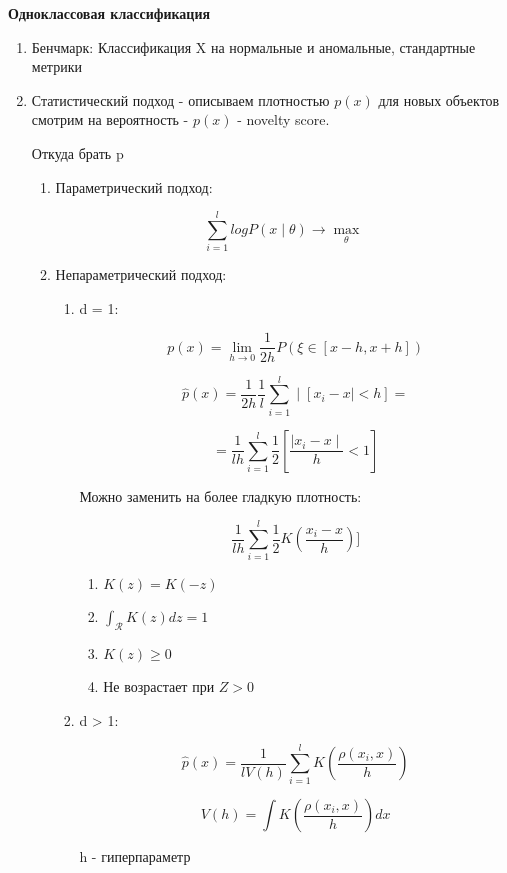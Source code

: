 \documentclass[a4paper, 12pt]{article}
\begin{document}
\textbf{Одноклассовая классификация}
\begin{enumerate}
    \item Бенчмарк: Классификация X на нормальные и аномальные, 
    стандартные метрики
    \item Статистический подход - описываем плотностью $p(x)$ для
    новых объектов смотрим на вероятность - $p(x)$ - novelty score.

    Откуда брать p
    \begin{enumerate}
        \item Параметрический подход:
        
        \[\sum_{i = 1}^l logP(x \mid \theta) 
        \rightarrow \max_{\theta}\]
        \item Непараметрический подход:
        \begin{enumerate}
            \item d = 1:
            
            \[p(x) = \lim_{h \to 0} 
            \frac{1}{2h}P(\xi \in [x - h, x + h])\]

            \[\hat{p}(x) = \frac{1}{2h}\frac{1}{l} 
            \sum_{i = 1}^l \mid [x_i - x \mid < h] =\]

            \[= \frac{1}{lh} \sum_{i = 1}^l 
            \frac{1}{2}[\frac{\mid x_i - x \mid}{h} < 1]\]

            Можно заменить на более гладкую плотность:

            \[\frac{1}{lh} \sum_{i = 1}^l 
            \frac{1}{2}K(\frac{x_i - x}{h})]\]

            \begin{enumerate}
                \item $K(z) = K(-z)$
                \item $\int_{\mathcal{R}} K(z)dz = 1$
                \item $K(z) \geq 0$
                \item Не возрастает при $Z > 0$
            \end{enumerate}
            \item d > 1:
            
            \[\hat{p}(x) = \frac{1}{lV(h)} \sum_{i = 1}^l 
            K(\frac{\rho(x_i, x)}{h})\]

            \[V(h) = \int K(\frac{\rho(x_i, x)}{h}) dx\]

            h - гиперпараметр
        \end{enumerate}
    \end{enumerate}


\end{enumerate}
\end{document}
